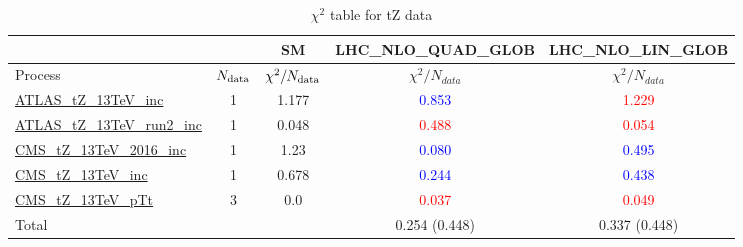 \documentclass{article}
\begin{document}
\begin{table}[H]
\centering
\begin{tabular}{|l|c|c|c|c|}
\hline
 \multicolumn{2}{|c|}{} & SM& LHC_NLO_QUAD_GLOB& LHC_NLO_LIN_GLOB\\ \hline
Process & $N_{\rm data}$ & $\chi^ 2/N_{\rm data}$& $\chi^ 2/N_{data}$& $\chi^ 2/N_{data}$\\ \hline
\href{https://arxiv.org}{ATLAS_tZ_13TeV_inc} & 1 & 1.177 & \textcolor{blue}                            {0.853} & \textcolor{red}                            {1.229} \\ \hline
\href{https://arxiv.org}{ATLAS_tZ_13TeV_run2_inc} & 1 & 0.048 & \textcolor{red}                            {0.488} & \textcolor{red}                            {0.054} \\ \hline
\href{https://arxiv.org}{CMS_tZ_13TeV_2016_inc} & 1 & 1.23 & \textcolor{blue}                            {0.080} & \textcolor{blue}                            {0.495} \\ \hline
\href{https://arxiv.org}{CMS_tZ_13TeV_inc} & 1 & 0.678 & \textcolor{blue}                            {0.244} & \textcolor{blue}                            {0.438} \\ \hline
\href{https://arxiv.org}{CMS_tZ_13TeV_pTt} & 3 & 0.0 & \textcolor{red}                            {0.037} & \textcolor{red}                            {0.049} \\ \hline
\hline Total & &  & 0.254 (0.448) & 0.337 (0.448) \\ \hline
\end{tabular}
\caption{$\chi^2$ table for tZ data}
\end{table}
\end{document}
